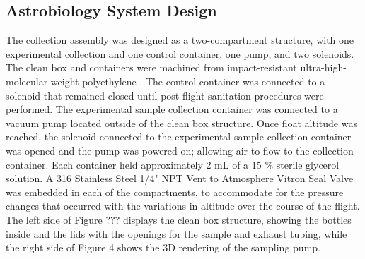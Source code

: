 \subsection{Astrobiology System Design}
\label{sec:Astrobiology Design}
The collection assembly was designed as a two-compartment structure, with one experimental collection and one control container, one pump, and two solenoids. The clean box and containers were machined from impact-resistant ultra-high-molecular-weight polyethylene \cite{cleanbox}. The control container was connected to a solenoid that remained closed until post-flight sanitation procedures were performed. The experimental sample collection container was connected to a vacuum pump located outside of the clean box structure. Once float altitude was reached, the solenoid connected to the experimental sample collection container was opened and the pump was powered on; allowing air to flow to the collection container. Each container held approximately 2 mL of a 15 \% sterile glycerol solution. A 316 Stainless Steel 1/4" NPT Vent to Atmosphere Vitron Seal Valve was embedded in each of the compartments, to accommodate for the pressure changes that occurred with the variations in altitude over the course of the flight. The left side of Figure ??? displays the clean box structure, showing the bottles inside and the lids with the openings for the sample and exhaust tubing, while the right side of Figure 4 shows the 3D rendering of the sampling pump.